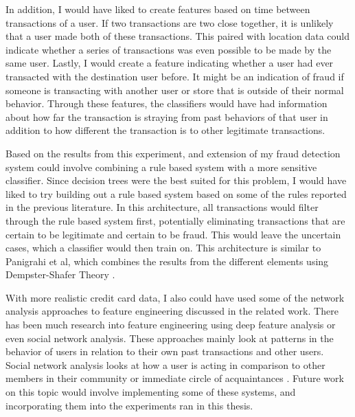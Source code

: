 \documentclass[midd]{thesis}
\begin{document}
In addition, I would have liked to create features based on time between transactions of a user. If two transactions are two close together, it is unlikely that a user made both of these transactions. This paired with location data could indicate whether a series of transactions was even possible to be made by the same user. Lastly, I would create a feature indicating whether a user had ever transacted with the destination user before. It might be an indication of fraud if someone is transacting with another user or store that is outside of their normal behavior. Through these features, the classifiers would have had information about how far the transaction is straying from past behaviors of that user in addition to how different the transaction is to other legitimate transactions.

Based on the results from this experiment, and extension of my fraud detection system could involve combining a rule based system with a more sensitive classifier. Since decision trees were the best suited for this problem, I would have liked to try building out a rule based system based on some of the rules reported in the previous literature. In this architecture, all transactions would filter through the rule based system first, potentially eliminating transactions that are certain to be legitimate and certain to be fraud. This would leave the uncertain cases, which a classifier would then train on. This architecture is similar to Panigrahi et al, which combines the results from the different elements using Dempster-Shafer Theory \cite{Panigrahi2009}.

With more realistic credit card data, I also could have used some of the network analysis approaches to feature engineering discussed in the related work. There has been much research into feature engineering using deep feature analysis or even social network analysis. These approaches mainly look at patterns in the behavior of users in relation to their own past transactions and other users. Social network analysis looks at how a user is acting in comparison to other members in their community or immediate circle of acquaintances \cite{Baesens}. Future work on this topic would involve implementing some of these systems, and incorporating them into the experiments ran in this thesis.   
\end{document}
